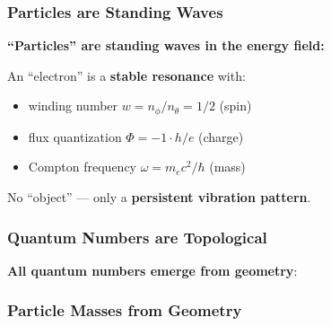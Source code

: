 	\subsubsection{Particles are Standing Waves}
	
	\begin{keyresult}
		\textbf{\enquote{Particles} are standing waves in the energy field:}
		
		\vspace{0.3cm}
		
		An \enquote{electron} is a \textbf{stable resonance} with:
		\begin{itemize}
			\item winding number $w = n_\phi/n_\theta = 1/2$ (spin)
			\item flux quantization $\Phi = -1 \cdot h/e$ (charge)
			\item Compton frequency $\omega = m_e c^2 / \hbar$ (mass)
		\end{itemize}
		
		\vspace{0.3cm}
		
		No \enquote{object} — only a \textbf{persistent vibration pattern}.
	\end{keyresult}
	
	\subsubsection{Quantum Numbers are Topological}
	
	\textbf{All quantum numbers emerge from geometry}:
	
	\begin{center}
	\end{center}
	
	\subsubsection{Particle Masses from Geometry}
	
